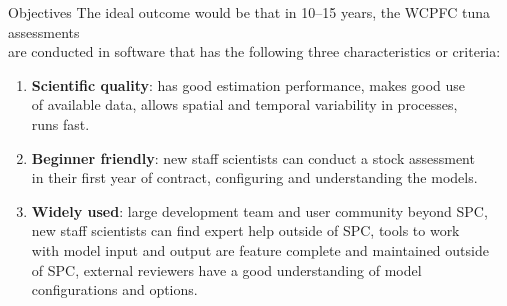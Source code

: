 \documentclass[aspectratio=169,fleqn]{beamer}
\begin{document}
\begin{frame}{Objectives}
  The ideal outcome would be that in 10--15 years, the WCPFC tuna assessments\\
  are conducted in software that has the following three characteristics or
  criteria:\\[1ex]
  \begin{enumerate}
    \item {\bf\blue Scientific quality}: has good estimation performance, makes
    good use\\
    of available data, allows spatial and temporal variability in processes,\\
    runs fast.\\[1.5ex]
    \item {\bf\blue Beginner friendly}: new staff scientists can conduct a stock
    assessment\\
    in their first year of contract, configuring and understanding the
    models.\\[1.5ex]
    \item {\bf\blue Widely used}: large development team and user community
    beyond SPC,\\
    new staff scientists can find expert help outside of SPC, tools
    to work\\
    with model input and output are feature complete and maintained
    outside\\
    of SPC, external reviewers have a good understanding of model\\
    configurations and options.\\[2ex]
  \end{enumerate}
\end{frame}

\end{document}
